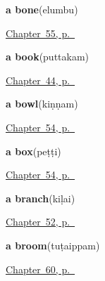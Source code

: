 \noindent\begin{minipage}[t]{\linewidth}
\raggedright
\textbf{a bone}\enspace\emph{}\enspace(elumbu)\par
\footnotesize \hyperref[ch:ta-the-rest-of-you]{Chapter~55, p.~\pageref*{ch:ta-the-rest-of-you}}
\end{minipage}\par\smallskip

\noindent\begin{minipage}[t]{\linewidth}
\raggedright
\textbf{a book}\enspace\emph{}\enspace(puttakam)\par
\footnotesize \hyperref[ch:ta-things-you-ask-for]{Chapter~44, p.~\pageref*{ch:ta-things-you-ask-for}}
\end{minipage}\par\smallskip

\noindent\begin{minipage}[t]{\linewidth}
\raggedright
\textbf{a bowl}\enspace\emph{}\enspace(kiṇṇam)\par
\footnotesize \hyperref[ch:ta-things-in-the-house]{Chapter~54, p.~\pageref*{ch:ta-things-in-the-house}}
\end{minipage}\par\smallskip

\noindent\begin{minipage}[t]{\linewidth}
\raggedright
\textbf{a box}\enspace\emph{}\enspace(peṭṭi)\par
\footnotesize \hyperref[ch:ta-things-in-the-house]{Chapter~54, p.~\pageref*{ch:ta-things-in-the-house}}
\end{minipage}\par\smallskip

\noindent\begin{minipage}[t]{\linewidth}
\raggedright
\textbf{a branch}\enspace\emph{}\enspace(kiḷai)\par
\footnotesize \hyperref[ch:ta-a-tree]{Chapter~52, p.~\pageref*{ch:ta-a-tree}}
\end{minipage}\par\smallskip

\noindent\begin{minipage}[t]{\linewidth}
\raggedright
\textbf{a broom}\enspace\emph{}\enspace(tuṭaippam)\par
\footnotesize \hyperref[ch:ta-things-people-make]{Chapter~60, p.~\pageref*{ch:ta-things-people-make}}
\end{minipage}\par\smallskip

